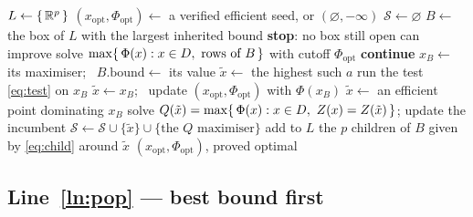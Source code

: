 \documentclass[11pt,a4paper]{article}
\begin{document}
\begin{algorithm}[H]
\caption{Criterion-space search for $(P_E)$}\label{alg:main}
\begin{algorithmic}[1]
\State $L \gets \{\, \mathbb{R}^p \,\}$ 
\State $(x_{\mathrm{opt}}, \Phi_{\mathrm{opt}}) \gets$ a verified efficient seed, or $(\varnothing, -\infty)$
\State $\mathcal{S} \gets \varnothing$ 
  \State $B \gets$ the box of $L$ with the largest inherited bound \label{ln:pop}
   \label{ln:exit}
     \State \textbf{stop}: no box still open can improve 
  \EndIf
  \State solve $\max \{\, \Phi(x) : x \in D,\ \text{rows of } B \,\}$ with cutoff $\Phi_{\mathrm{opt}}$ \label{ln:solve}
     \State \textbf{continue}  \label{ln:drop}
  \EndIf
  \State $x_B \gets$ its maximiser; \ $B.\mathrm{bound} \gets$ its value
   \label{ln:known}
     \State $\tilde{x} \gets$ the highest such $a$ 
  \Else
     \State run the test \eqref{eq:test} on $x_B$ \label{ln:test}
        \State $\tilde{x} \gets x_B$; \ update $(x_{\mathrm{opt}}, \Phi_{\mathrm{opt}})$ with $\Phi(x_B)$ \label{ln:eff}
        \Statex \hspace{\algorithmicindent}
     \Else
        \State $\tilde{x} \gets$ an efficient point dominating $x_B$  \label{ln:repair}
     \EndIf
  \EndIf
     \State solve $Q(\tilde{x}) = \max \{\, \Phi(x) : x \in \Dset,\ \Z(x) = \Z(\tilde{x}) \,\}$; update the incumbent \label{ln:q}
  \EndIf
  \State $\mathcal{S} \gets \mathcal{S} \cup \{\tilde{x}\} \cup \{\text{the } Q \text{ maximiser}\}$ \label{ln:remember}
  \State add to $L$ the $p$ children of $B$ given by \eqref{eq:child} around $\tilde{x}$ \label{ln:split}
\EndWhile
\State \Return $(x_{\mathrm{opt}}, \Phi_{\mathrm{opt}})$, proved optimal
\end{algorithmic}
\end{algorithm}

\subsection{Line~\ref{ln:pop} --- best bound first}
\end{document}
